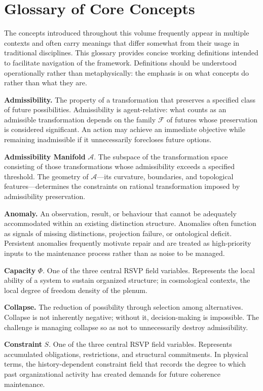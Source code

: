 \documentclass[11pt, oneside]{book}
\theoremstyle{definition}
\theoremstyle{remark}
\begin{document}
\chapter{Glossary of Core Concepts}

The concepts introduced throughout this volume frequently appear in multiple contexts and often carry meanings that differ somewhat from their usage in traditional disciplines. This glossary provides concise working definitions intended to facilitate navigation of the framework. Definitions should be understood operationally rather than metaphysically: the emphasis is on what concepts do rather than what they are.

\textbf{Admissibility.} The property of a transformation that preserves a specified class of future possibilities. Admissibility is agent-relative: what counts as an admissible transformation depends on the family $\mathcal{F}$ of futures whose preservation is considered significant. An action may achieve an immediate objective while remaining inadmissible if it unnecessarily forecloses future options.

\textbf{Admissibility Manifold} $\mathcal{A}$. The subspace of the transformation space consisting of those transformations whose admissibility exceeds a specified threshold. The geometry of $\mathcal{A}$—its curvature, boundaries, and topological features—determines the constraints on rational transformation imposed by admissibility preservation.

\textbf{Anomaly.} An observation, result, or behaviour that cannot be adequately accommodated within an existing distinction structure. Anomalies often function as signals of missing distinctions, projection failure, or ontological deficit. Persistent anomalies frequently motivate repair and are treated as high-priority inputs to the maintenance process rather than as noise to be managed.

\textbf{Capacity} $\Phi$. One of the three central RSVP field variables. Represents the local ability of a system to sustain organized structure; in cosmological contexts, the local degree of freedom density of the plenum.

\textbf{Collapse.} The reduction of possibility through selection among alternatives. Collapse is not inherently negative; without it, decision-making is impossible. The challenge is managing collapse so as not to unnecessarily destroy admissibility.

\textbf{Constraint} $S$. One of the three central RSVP field variables. Represents accumulated obligations, restrictions, and structural commitments. In physical terms, the history-dependent constraint field that records the degree to which past organizational activity has created demands for future coherence maintenance.
\end{document}
